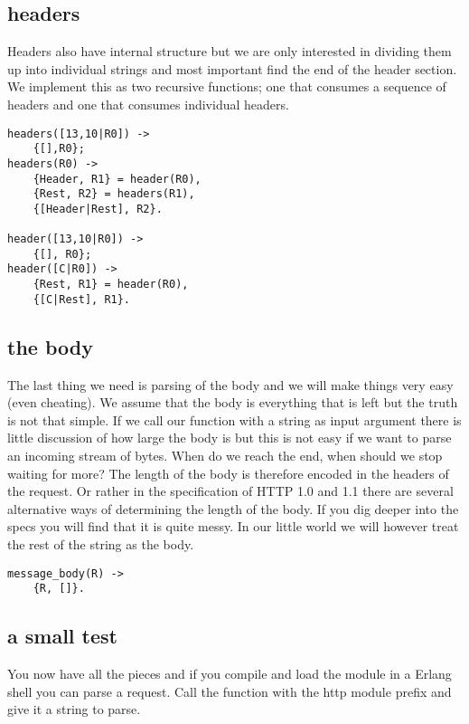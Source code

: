 \documentclass[a4paper, 11pt]{article}
\begin{document}
\subsection{headers}

Headers also have internal structure but we are only interested in
dividing them up into individual strings and most important find the
end of the header section. We implement this as two recursive functions;
one that consumes a sequence of headers and one that consumes
individual headers.


\begin{verbatim}
headers([13,10|R0]) ->
    {[],R0};
headers(R0) ->
    {Header, R1} = header(R0),
    {Rest, R2} = headers(R1),
    {[Header|Rest], R2}.

header([13,10|R0]) ->
    {[], R0};
header([C|R0]) ->
    {Rest, R1} = header(R0),
    {[C|Rest], R1}.     
\end{verbatim}    

\subsection{the body}

The last thing we need is parsing of the body and we will make things
very easy (even cheating). We assume that the body is everything that
is left but the truth is not that simple. If we call our function with
a string as input argument there is little discussion of how large the
body is but this is not easy if we want to parse an incoming stream
of bytes. When do we reach the end, when should we stop waiting for
more? The length of the body is therefore encoded in the headers of
the request. Or rather in the specification of HTTP 1.0 and 1.1 there
are several alternative ways of determining the length of the
body. If you dig deeper into the specs you will find that it is quite
messy. In our little world we will however treat the rest of the string
as the body.

\begin{verbatim}
message_body(R) ->
    {R, []}.
\end{verbatim}    

\subsection{a small test}

You now have all the pieces and if you compile and load the module in
a Erlang shell you can parse a request. Call the function with the
http module prefix and give it a string to parse.
\end{document}
